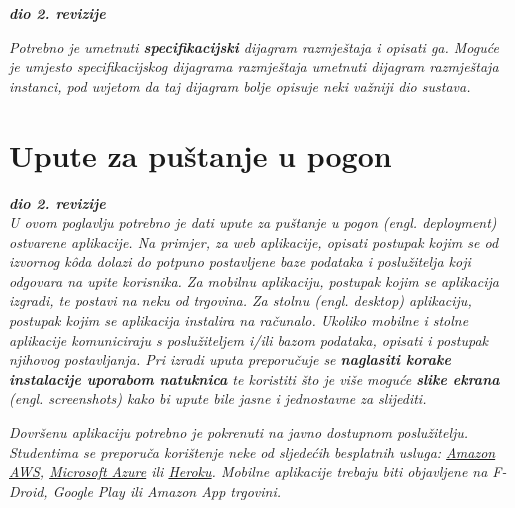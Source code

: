 			\textbf{\textit{dio 2. revizije}}
			
			 \textit{Potrebno je umetnuti \textbf{specifikacijski} dijagram razmještaja i opisati ga. Moguće je umjesto specifikacijskog dijagrama razmještaja umetnuti dijagram razmještaja instanci, pod uvjetom da taj dijagram bolje opisuje neki važniji dio sustava.}
			
			\eject 
		
		\section{Upute za puštanje u pogon}
		
			\textbf{\textit{dio 2. revizije}}\\
		
			 \textit{U ovom poglavlju potrebno je dati upute za puštanje u pogon (engl. deployment) ostvarene aplikacije. Na primjer, za web aplikacije, opisati postupak kojim se od izvornog kôda dolazi do potpuno postavljene baze podataka i poslužitelja koji odgovara na upite korisnika. Za mobilnu aplikaciju, postupak kojim se aplikacija izgradi, te postavi na neku od trgovina. Za stolnu (engl. desktop) aplikaciju, postupak kojim se aplikacija instalira na računalo. Ukoliko mobilne i stolne aplikacije komuniciraju s poslužiteljem i/ili bazom podataka, opisati i postupak njihovog postavljanja. Pri izradi uputa preporučuje se \textbf{naglasiti korake instalacije uporabom natuknica} te koristiti što je više moguće \textbf{slike ekrana} (engl. screenshots) kako bi upute bile jasne i jednostavne za slijediti.}
			
			
			 \textit{Dovršenu aplikaciju potrebno je pokrenuti na javno dostupnom poslužitelju. Studentima se preporuča korištenje neke od sljedećih besplatnih usluga: \href{https://aws.amazon.com/}{Amazon AWS}, \href{https://azure.microsoft.com/en-us/}{Microsoft Azure} ili \href{https://www.heroku.com/}{Heroku}. Mobilne aplikacije trebaju biti objavljene na F-Droid, Google Play ili Amazon App trgovini.}
			
			
			\eject 
